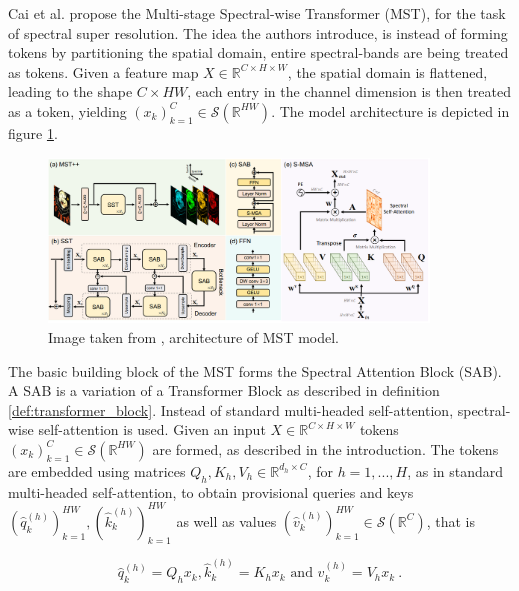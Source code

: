 Cai et al. \cite{caiMSTMultistageSpectralwise2022a} propose the Multi-stage Spectral-wise Transformer (MST),
for the task of spectral super resolution.
The idea the authors introduce, is instead of forming tokens by partitioning the spatial domain,
entire spectral-bands are being treated as tokens.
Given a feature map $X \in \mathbb R^{C \times H \times W}$, the spatial domain is flattened,
leading to the shape $C \times HW$,
each entry in the channel dimension is then treated as a token, 
yielding $(x_k)_{k=1}^{C} \in \mathcal S( \mathbb R^{HW})$.
The model architecture is depicted in figure \ref{fig:mst}.

\begin{figure}[h!]
    \includegraphics[width=0.9\textwidth]{models/ssr/imgs/mst.png}
    \caption{Image taken from \cite{caiMSTMultistageSpectralwise2022a}, architecture of MST model.}
    \label{fig:mst}
\end{figure}

The basic building block of the MST forms the Spectral Attention Block (SAB).
A SAB is a variation of a Transformer Block as described in definition \ref{def:transformer_block}.
Instead of standard multi-headed self-attention, spectral-wise self-attention is used.
Given an input $X \in \mathbb R^{C \times H \times W}$ tokens $(x_k)_{k = 1}^C \in \mathcal S (\mathbb R^{HW})$ are formed,
as described in the introduction.
The tokens are embedded using matrices $Q_h, K_h, V_h \in \mathbb R^{d_h \times C}$,
for $h = 1, ..., H$, as in standard multi-headed self-attention, 
to obtain provisional queries and keys $(\hat{q}_k^{(h)})_{k=1}^{HW}, (\hat{k}_k^{(h)})_{k=1}^{HW}$ 
as well as values $(\hat{v}_k^{(h)})_{k=1}^{HW} \in \mathcal{S}(\mathbb R^{C})$, that is

    \begin{equation} \label{eq:smsa1}
        \hat{q}_k^{(h)} = Q_h x_k, \hat{k}_k^{(h)} = K_h x_k \text{ and } \hat{v}_k^{(h)} = V_h x_k ~.
    \end{equation}

